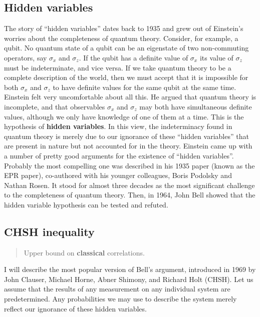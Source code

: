 \documentclass{article}
\begin{document}
\hypertarget{hidden-variables}{%
\subsection{Hidden variables}\label{hidden-variables}}

The story of ``hidden variables'' dates back to 1935 and grew out of Einstein's worries about the completeness of quantum theory.
Consider, for example, a qubit.
No quantum state of a qubit can be an eigenstate of two non-commuting operators, say \(\sigma_x\) and \(\sigma_z\).
If the qubit has a definite value of \(\sigma_x\) its value of \(\sigma_z\) must be indeterminate, and vice versa.
If we take quantum theory to be a complete description of the world, then we must accept that it is impossible for both \(\sigma_x\) and \(\sigma_z\) to have definite values for the same qubit at the same time.
Einstein felt very uncomfortable about all this.
He argued that quantum theory is incomplete, and that observables \(\sigma_x\) and \(\sigma_z\) may both have simultaneous definite values, although we only have knowledge of one of them at a time.
This is the hypothesis of \textbf{hidden variables}.
In this view, the indeterminacy found in quantum theory is merely due to our ignorance of these ``hidden variables'' that are present in nature but not accounted for in the theory.
Einstein came up with a number of pretty good arguments for the existence of ``hidden variables''.
Probably the most compelling one was described in his 1935 paper (known as the EPR paper), co-authored with his younger colleagues, Boris Podolsky and Nathan Rosen.
It stood for almost three decades as the most significant challenge to the completeness of quantum theory.
Then, in 1964, John Bell showed that the hidden variable hypothesis can be tested and refuted.

\hypertarget{chsh-inequality}{%
\subsection{CHSH inequality}\label{chsh-inequality}}

\begin{quote}
Upper bound on \textbf{classical} correlations.
\end{quote}

I will describe the most popular version of Bell's argument, introduced in 1969 by John Clauser, Michael Horne, Abner Shimony, and Richard Holt (CHSH).
Let us assume that the results of any measurement on any individual system are predetermined.
Any probabilities we may use to describe the system merely reflect our ignorance of these hidden variables.
\end{document}

